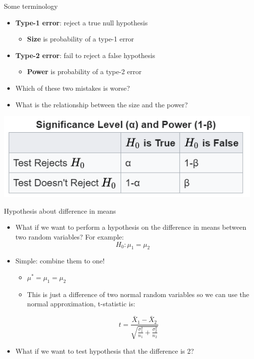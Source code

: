 \documentclass[aspectratio=169]{beamer}
\begin{document}
\begin{frame}{Some terminology}
    \begin{itemize}
        \item \textbf{Type-1 error}: reject a true null hypothesis
        \begin{itemize}
            \item \textbf{Size} is probability of a type-1 error
        \end{itemize}
        \item \textbf{Type-2 error}: fail to reject a false hypothesis
        \begin{itemize}
            \item \textbf{Power} is probability of a type-2 error
        \end{itemize}
        \item Which of these two mistakes is worse?
        \item What is the relationship between the size and the power?
    \end{itemize}
\end{frame}

\begin{frame}
    \centering
    \includegraphics[width = .6\textwidth,keepaspectratio]{size_and_power.png}
\end{frame}


\begin{frame}{Hypothesis about difference in means}
    \begin{itemize}
        \item What if we want to perform a hypothesis on the difference in means between two random variables? For example:
        $$H_0 : \mu_1 = \mu_2 $$
        \item Simple: combine them to one!
        \begin{itemize}
            \item $\mu^* = \mu_1 = \mu_2$
            \item This is just a difference of two normal random variables so we can use the normal approximation, t-statistic is:
            
            $$t = \frac{\bar{X}_1 - \bar{X}_2}{\sqrt{\frac{\sigma_1^2}{n_1} + \frac{\sigma_2^2}{n_2}}}$$
        \end{itemize}
        \item What if we want to test hypothesis that the difference is 2?
    \end{itemize}
\end{frame}
\end{document}
